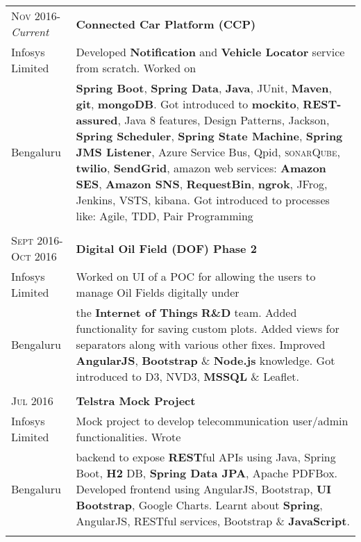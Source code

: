 \documentclass[a4paper,10pt]{article} %
\begin{document}
\begin{tabular}{l|p{11cm}}
\textsc{Nov 2016-}\emph{Current} & \textbf{Connected Car Platform (CCP)} \\
Infosys Limited & \footnotesize{Developed \textbf{Notification} and \textbf{Vehicle Locator} service from scratch. Worked on}\\ 
Bengaluru & \footnotesize{\textbf{Spring Boot}, \textbf{Spring Data}, \textbf{Java}, JUnit, \textbf{Maven}, \textbf{git}, \textbf{mongoDB}. Got introduced to \textbf{mockito}, \textbf{REST-assured}, Java 8 features, Design Patterns, Jackson, \textbf{Spring Scheduler}, \textbf{Spring State Machine}, \textbf{Spring JMS Listener}, Azure Service Bus, Qpid, \textsc{sonar}Q\textsc{ube}, \textbf{twilio}, \textbf{SendGrid}, amazon web services: \textbf{Amazon SES}, \textbf{Amazon SNS}, \textbf{RequestBin}, \textbf{ngrok}, JFrog, Jenkins, VSTS,  kibana. Got introduced to processes like: Agile, TDD, Pair Programming}\\
\multicolumn{2}{c}{} \\


\textsc{Sept 2016-Oct 2016} & \textbf{Digital Oil Field (DOF) Phase 2}\emph{}\\
Infosys Limited & \footnotesize{Worked on UI of a POC for allowing the users to manage Oil Fields digitally under}\\
Bengaluru & \footnotesize{the \textbf{Internet of Things} \textbf{R\&D} team. Added functionality for saving custom plots. Added views for separators along with various other fixes. Improved \textbf{AngularJS}, \textbf{Bootstrap} \& \textbf{Node.js} knowledge. Got introduced to D3, NVD3, \textbf{MSSQL} \& Leaflet.}\\
\multicolumn{2}{c}{} \\


\textsc{Jul 2016} & \textbf{Telstra Mock Project} \emph{}\\
Infosys Limited & \footnotesize{Mock project to develop telecommunication user/admin functionalities. Wrote}\\
Bengaluru & \footnotesize{backend to expose \textbf{REST}ful APIs using Java, Spring Boot, \textbf{H2} DB, \textbf{Spring Data JPA}, Apache PDFBox. Developed frontend using AngularJS, Bootstrap, \textbf{UI Bootstrap}, Google Charts. Learnt about \textbf{Spring}, AngularJS, RESTful services, Bootstrap \& \textbf{JavaScript}.}\\
\multicolumn{2}{c}{} \\


\end{tabular}
\end{document}
